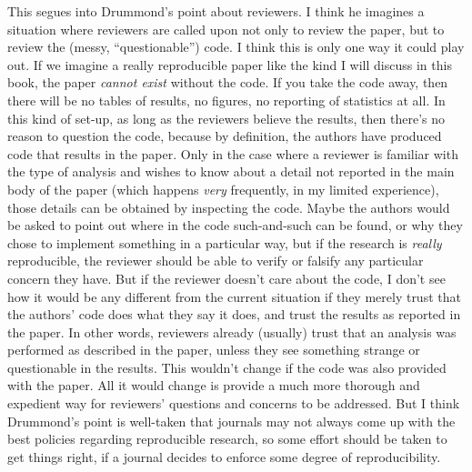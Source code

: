 \documentclass{book}
\begin{document}
This segues into Drummond's point about reviewers. I think he imagines a situation where reviewers are called upon not only to review the paper, but to review the (messy, ``questionable'') code. I think this is only one way it could play out. If we imagine a really reproducible paper like the kind I will discuss in this book, the paper \emph{cannot exist} without the code. If you take the code away, then there will be no tables of results, no figures, no reporting of statistics at all.  In this kind of set-up, as long as the reviewers believe the results, then there's no reason to question the code, because by definition, the authors have produced code that results in the paper. Only in the case where a reviewer is familiar with the type of analysis and wishes to know about a detail not reported in the main body of the paper (which happens \emph{very} frequently, in my limited experience), those details can be obtained by inspecting the code. Maybe the authors would be asked to point out where in the code such-and-such can be found, or why they chose to implement something in a particular way, but if the research is \emph{really} reproducible, the reviewer should be able to verify or falsify any particular concern they have.  But if the reviewer doesn't care about the code, I don't see how it would be any different from the current situation if they merely trust that the authors' code does what they say it does, and trust the results as reported in the paper. In other words, reviewers already (usually) trust that an analysis was performed as described in the paper, unless they see something strange or questionable in the results. This wouldn't change if the code was also provided with the paper. All it would change is provide a much more thorough and expedient way for reviewers' questions and concerns to be addressed.  But I think Drummond's point is well-taken that journals may not always come up with the best policies regarding reproducible research, so some effort should be taken to get things right, if a journal decides to enforce some degree of reproducibility.
\end{document}
